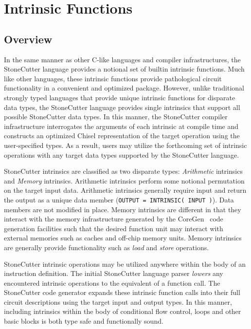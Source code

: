 \documentclass{article}
\begin{document}
\clearpage
\section{Intrinsic Functions}
\label{sec:IntrinsicFunctions}

\subsection{Overview}
\label{sec:IntrinsicOverview}

In the same manner as other C-like languages and compiler infrastructures, 
the StoneCutter language provides a notional set of builtin intrinsic functions.  
Much like other languages, these intrinsic functions provide pathological 
circuit functionality in a convenient and optimized package.  However, 
unlike traditional strongly typed languages that provide unique intrinsic 
functions for disparate data types, the StoneCutter language provides 
single intrinsics that support all possible StoneCutter data types.  In this manner, 
the StoneCutter compiler infrastructure interrogates the arguments of each intrinsic 
at compile time and constructs an optimized Chisel representation of the target 
operation using the user-specified types.  As a result, users may utilize the forthcoming 
set of intrinsic operations with any target data types supported by the StoneCutter language.  

StoneCutter intrinsics are classified as two disparate types: \textit{Arithmetic} intrinsics and 
\textit{Memory} intrinsics.  Arithmetic intrinsics perform some notional permutation on the target 
input data.  Arithmetic intrinsics generally require input and return the output as a unique data 
member (\texttt{OUTPUT = INTRINSIC( INPUT )}).  Data members are not modified in place.  
Memory intrinsics are different in that they interact with the memory infrastructure generated 
by the CoreGen~\cite{IRSpec} code generation facilities such that the desired function unit may interact with 
external memories such as caches and off-chip memory units.  Memory intrinsics are generally 
provide functionality such as \textit{load} and \textit{store} operations.  

StoneCutter intrinsic operations may be utilized anywhere within the body of an instruction definition.  
The initial StoneCutter language parser \textit{lowers} any encountered intrinsic operations to the equivalent 
of a function call.  The StoneCutter code generator expands these intrinsic function calls into their 
full circuit descriptions using the target input and output types.  In this manner, including intrinsics within 
the body of conditional flow control, loops and other basic blocks is both type safe and functionally sound.    
\end{document}
